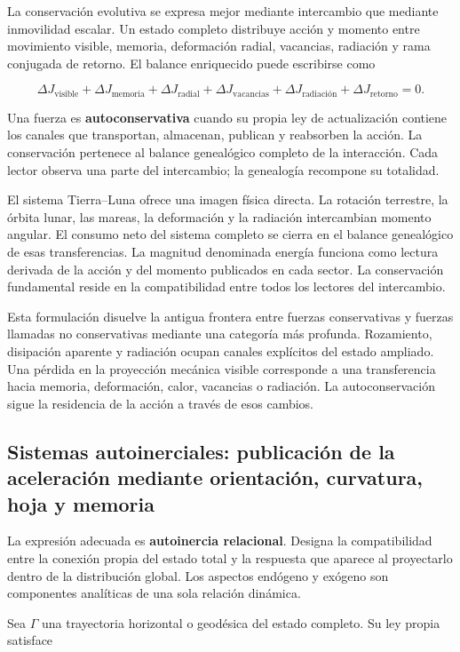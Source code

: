 La conservación evolutiva se expresa mejor mediante intercambio que mediante inmovilidad escalar. Un estado completo distribuye acción y momento entre movimiento visible, memoria, deformación radial, vacancias, radiación y rama conjugada de retorno. El balance enriquecido puede escribirse como

\[
\Delta J_{\mathrm{visible}}
+\Delta J_{\mathrm{memoria}}
+\Delta J_{\mathrm{radial}}
+\Delta J_{\mathrm{vacancias}}
+\Delta J_{\text{radiación}}
+\Delta J_{\mathrm{retorno}}
=0.
\]

Una fuerza es \textbf{autoconservativa} cuando su propia ley de actualización contiene los canales que transportan, almacenan, publican y reabsorben la acción. La conservación pertenece al balance genealógico completo de la interacción. Cada lector observa una parte del intercambio; la genealogía recompone su totalidad.

El sistema Tierra–Luna ofrece una imagen física directa. La rotación terrestre, la órbita lunar, las mareas, la deformación y la radiación intercambian momento angular. El consumo neto del sistema completo se cierra en el balance genealógico de esas transferencias. La magnitud denominada energía funciona como lectura derivada de la acción y del momento publicados en cada sector. La conservación fundamental reside en la compatibilidad entre todos los lectores del intercambio.

Esta formulación disuelve la antigua frontera entre fuerzas conservativas y fuerzas llamadas no conservativas mediante una categoría más profunda. Rozamiento, disipación aparente y radiación ocupan canales explícitos del estado ampliado. Una pérdida en la proyección mecánica visible corresponde a una transferencia hacia memoria, deformación, calor, vacancias o radiación. La autoconservación sigue la residencia de la acción a través de esos cambios.

\subsection{Sistemas autoinerciales: publicación de la aceleración mediante orientación, curvatura, hoja y memoria}

La expresión adecuada es \textbf{autoinercia relacional}. Designa la compatibilidad entre la conexión propia del estado total y la respuesta que aparece al proyectarlo dentro de la distribución global. Los aspectos endógeno y exógeno son componentes analíticas de una sola relación dinámica.

Sea \(\Gamma\) una trayectoria horizontal o geodésica del estado completo. Su ley propia satisface

